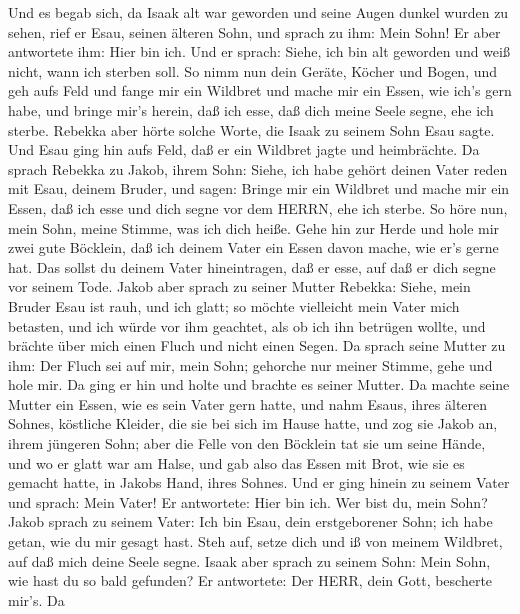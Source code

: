  Und es begab sich, da Isaak alt war geworden und seine
Augen dunkel wurden zu sehen, rief er Esau, seinen älteren Sohn, und
sprach zu ihm: Mein Sohn! Er aber antwortete ihm: Hier bin ich.
 Und er sprach: Siehe, ich bin alt geworden und weiß nicht,
wann ich sterben soll.  So nimm nun dein Geräte, Köcher und
Bogen, und geh aufs Feld und fange mir ein Wildbret  und
mache mir ein Essen, wie ich's gern habe, und bringe mir's herein, daß
ich esse, daß dich meine Seele segne, ehe ich sterbe. 
Rebekka aber hörte solche Worte, die Isaak zu seinem Sohn Esau sagte.
Und Esau ging hin aufs Feld, daß er ein Wildbret jagte und heimbrächte.
 Da sprach Rebekka zu Jakob, ihrem Sohn: Siehe, ich habe
gehört deinen Vater reden mit Esau, deinem Bruder, und sagen:
 Bringe mir ein Wildbret und mache mir ein Essen, daß ich
esse und dich segne vor dem HERRN, ehe ich sterbe.  So höre
nun, mein Sohn, meine Stimme, was ich dich heiße.  Gehe hin
zur Herde und hole mir zwei gute Böcklein, daß ich deinem Vater ein
Essen davon mache, wie er's gerne hat.  Das sollst du
deinem Vater hineintragen, daß er esse, auf daß er dich segne vor seinem
Tode.  Jakob aber sprach zu seiner Mutter Rebekka: Siehe,
mein Bruder Esau ist rauh, und ich glatt;  so möchte
vielleicht mein Vater mich betasten, und ich würde vor ihm geachtet, als
ob ich ihn betrügen wollte, und brächte über mich einen Fluch und nicht
einen Segen.  Da sprach seine Mutter zu ihm: Der Fluch sei
auf mir, mein Sohn; gehorche nur meiner Stimme, gehe und hole mir.
 Da ging er hin und holte und brachte es seiner Mutter. Da
machte seine Mutter ein Essen, wie es sein Vater gern hatte,
 und nahm Esaus, ihres älteren Sohnes, köstliche Kleider,
die sie bei sich im Hause hatte, und zog sie Jakob an, ihrem jüngeren
Sohn;  aber die Felle von den Böcklein tat sie um seine
Hände, und wo er glatt war am Halse,  und gab also das
Essen mit Brot, wie sie es gemacht hatte, in Jakobs Hand, ihres Sohnes.
 Und er ging hinein zu seinem Vater und sprach: Mein Vater!
Er antwortete: Hier bin ich. Wer bist du, mein Sohn?  Jakob
sprach zu seinem Vater: Ich bin Esau, dein erstgeborener Sohn; ich habe
getan, wie du mir gesagt hast. Steh auf, setze dich und iß von meinem
Wildbret, auf daß mich deine Seele segne.  Isaak aber
sprach zu seinem Sohn: Mein Sohn, wie hast du so bald gefunden? Er
antwortete: Der HERR, dein Gott, bescherte mir's.  Da
